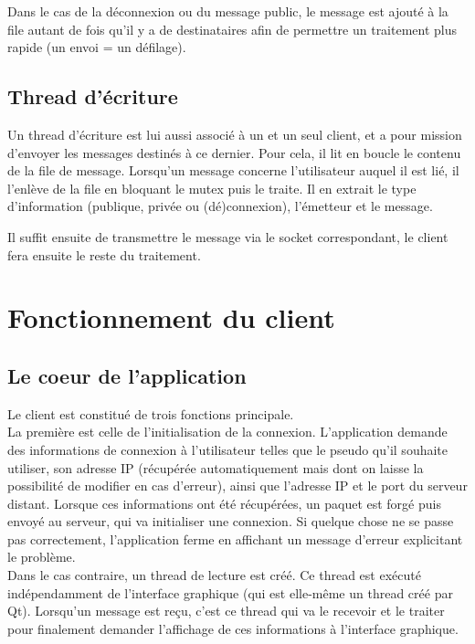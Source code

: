 			Dans le cas de la déconnexion ou du message public, le message est ajouté à la file autant de fois qu'il y a de destinataires afin de permettre un traitement plus rapide (un envoi = un défilage).
			
		\subsection{Thread d'écriture}
			Un thread d'écriture est lui aussi associé à un et un seul client, et a pour mission d'envoyer les messages destinés à ce dernier. Pour cela, il lit en boucle le contenu de la file de message. Lorsqu'un message concerne l'utilisateur auquel il est lié, il l'enlève de la file en bloquant le mutex puis le traite. Il en extrait le type d'information (publique, privée ou (dé)connexion), l'émetteur et le message.
			
			Il suffit ensuite de transmettre le message via le socket correspondant, le client fera ensuite le reste du traitement.
			
	
	\section{Fonctionnement du client}
		\subsection{Le coeur de l'application}
			Le client est constitué de trois fonctions principale.\\
			
			La première est celle de l'initialisation de la connexion. L'application demande des informations de connexion à l'utilisateur telles que le pseudo qu'il souhaite utiliser, son adresse IP (récupérée automatiquement mais dont on laisse la possibilité de modifier en cas d'erreur), ainsi que l'adresse IP et le port du serveur distant. Lorsque ces informations ont été récupérées, un paquet est forgé puis envoyé au serveur, qui va initialiser une connexion. Si quelque chose ne se passe pas correctement, l'application ferme en affichant un message d'erreur explicitant le problème.\\
			
			Dans le cas contraire, un thread de lecture est créé. Ce thread est exécuté indépendamment de l'interface graphique (qui est elle-même un thread créé par Qt). Lorsqu'un message est reçu, c'est ce thread qui va le recevoir et le traiter pour finalement demander l'affichage de ces informations à l'interface graphique.\\
		 
